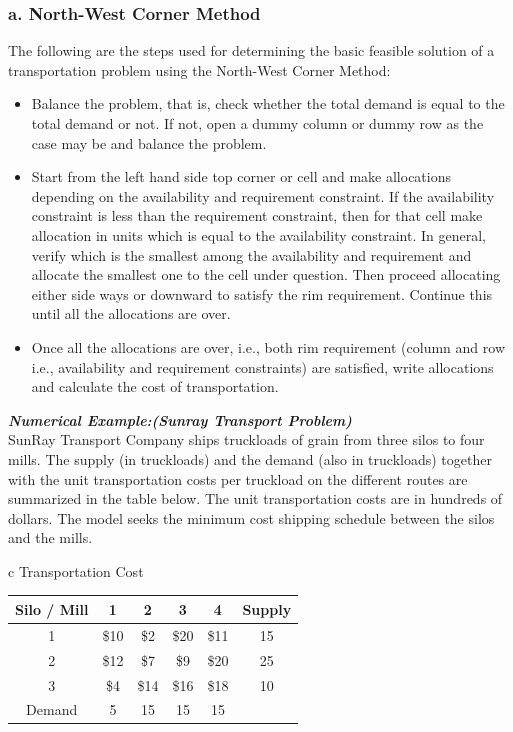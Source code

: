 \subsubsection{a. North-West Corner Method}
The following are the steps used for determining the basic feasible solution of a transportation problem using the North-West Corner Method:
\begin{itemize}
	\item Balance the problem, that is, check whether the total demand is equal to the total demand or not. If not, open a dummy column or dummy row as the case may be and balance the problem.
	\item Start from the left hand side top corner or cell and make allocations depending on the availability and requirement constraint. If the availability constraint is less than the requirement constraint, then for that cell make allocation in units which is equal to the availability constraint. In general, verify which is the smallest among the availability and requirement and allocate the smallest one to the cell under question. Then proceed allocating either side ways or downward to satisfy the rim requirement. Continue this until all the allocations are over.
	\item Once all the allocations are over, i.e., both rim requirement (column and row i.e., availability and requirement constraints) are satisfied, write allocations and calculate the cost of transportation.
\end{itemize}
\textbf{\textit{Numerical Example:(Sunray Transport Problem)}}\\
SunRay Transport Company ships truckloads of grain from three silos to four mills. The supply (in truckloads) and the demand (also in truckloads) together with the unit transportation costs per truckload on the different routes are summarized in the table below. The unit transportation costs are in hundreds of dollars. The model seeks the minimum cost shipping schedule between the silos and the mills.
\begin{center}
	\begin{tabular}{c}
		Transportation Cost\\
		 \hline
		\begin{tabular}{c | c | c | c | c | c}
			Silo / Mill \cellcolor{cyan} & 1 \cellcolor{cyan} & 2 \cellcolor{cyan} & 3 \cellcolor{cyan} & 4 \cellcolor{cyan} & Supply \cellcolor{cyan}\\
			\hline
			1 \cellcolor{cyan} & \$10 & \$2 & \$20 & \$11 & 15\\
			\hline
			2 \cellcolor{cyan} & \$12 & \$7 & \$9 & \$20 & 25\\
			\hline
			3 \cellcolor{cyan} & \$4 & \$14 & \$16 & \$18 & 10\\
			\hline
			Demand \cellcolor{cyan} & 5 & 15 & 15 & 15 & 
		\end{tabular}
	\end{tabular}
\end{center}

